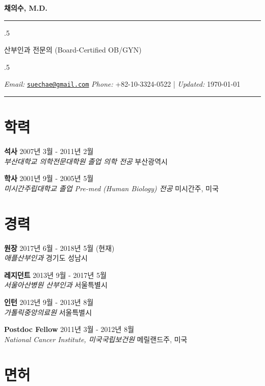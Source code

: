 \documentclass[12pt,]{article}
\begin{document}
\centerline{\huge \bf 채의수, M.D.}

\vspace{2 mm}

\hrule

\vspace{2 mm}

\moveleft.5\hoffset\centerline{산부인과 전문의 (Board-Certified OB/GYN)}

\moveleft.5\hoffset\centerline{ \emph{Email:} \href{mailto:}{\href{mailto:suechae@gmail.com}{\nolinkurl{suechae@gmail.com}}} \hspace{1 mm} \emph{Phone:}  +82-10-3324-0522  \hspace{1 mm}       | \emph{Updated:} \today}

\vspace{2 mm}

\hrule


\section{학력}

\textbf{석사} \hfill 2007년 3월 - 2011년 2월\\
\emph{부산대학교 의학전문대학원 졸업 \textbar{} 의학 전공}
\hfill 부산광역시

\textbf{학사} \hfill 2001년 9월 - 2005년 5월\\
\emph{미시간주립대학교 졸업 \textbar{} Pre-med (Human Biology) 전공}
\hfill 미시간주, 미국

\section{경력}

\textbf{원장} \hfill 2017년 6월 - 2018년 5월 (현재)\\
\emph{애플산부인과} \hfill 경기도 성남시

\textbf{레지던트} \hfill 2013년 9월 - 2017년 5월\\
\emph{서울아산병원 산부인과} \hfill 서울특별시

\textbf{인턴} \hfill 2012년 9월 - 2013년 8월\\
\emph{가톨릭중앙의료원} \hfill 서울특별시

\textbf{Postdoc Fellow} \hfill 2011년 3월 - 2012년 8월\\
\emph{National Cancer Institute, 미국국립보건원} \hfill 메릴랜드주, 미국

\section{면허}
\end{document}
